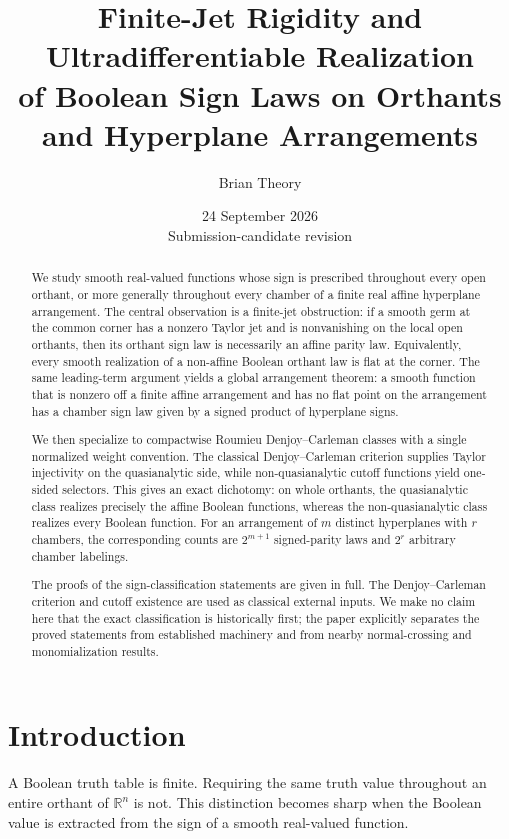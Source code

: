 \documentclass[11pt]{article}
\title{\vspace{-1.2cm}\textbf{Finite-Jet Rigidity and Ultradifferentiable Realization\\of Boolean Sign Laws on Orthants and Hyperplane Arrangements}}
\author{Brian Theory}
\date{24 September 2026\\\small Submission-candidate revision}
\theoremstyle{definition}
\theoremstyle{remark}
\newcommand{\R}{\mathbb{R}}
\begin{document}
\maketitle

\begin{abstract}
We study smooth real-valued functions whose sign is prescribed throughout every open orthant, or more generally throughout every chamber of a finite real affine hyperplane arrangement. The central observation is a finite-jet obstruction: if a smooth germ at the common corner has a nonzero Taylor jet and is nonvanishing on the local open orthants, then its orthant sign law is necessarily an affine parity law. Equivalently, every smooth realization of a non-affine Boolean orthant law is flat at the corner. The same leading-term argument yields a global arrangement theorem: a smooth function that is nonzero off a finite affine arrangement and has no flat point on the arrangement has a chamber sign law given by a signed product of hyperplane signs.

We then specialize to compactwise Roumieu Denjoy--Carleman classes with a single normalized weight convention. The classical Denjoy--Carleman criterion supplies Taylor injectivity on the quasianalytic side, while non-quasianalytic cutoff functions yield one-sided selectors. This gives an exact dichotomy: on whole orthants, the quasianalytic class realizes precisely the affine Boolean functions, whereas the non-quasianalytic class realizes every Boolean function. For an arrangement of $m$ distinct hyperplanes with $r$ chambers, the corresponding counts are $2^{m+1}$ signed-parity laws and $2^r$ arbitrary chamber labelings.

The proofs of the sign-classification statements are given in full. The Denjoy--Carleman criterion and cutoff existence are used as classical external inputs. We make no claim here that the exact classification is historically first; the paper explicitly separates the proved statements from established machinery and from nearby normal-crossing and monomialization results.
\end{abstract}

\section{Introduction}

A Boolean truth table is finite. Requiring the same truth value throughout an entire orthant of $\R^n$ is not. This distinction becomes sharp when the Boolean value is extracted from the sign of a smooth real-valued function.
\end{document}
